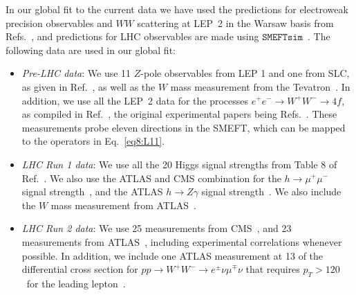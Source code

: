 \documentclass[../report.tex]{subfiles}
\begin{document}
In our global fit to the current data we have used the predictions for electroweak precision observables and $WW$ scattering at LEP~2 in the 
Warsaw basis from Refs.~\cite{Berthier:2016tkq, Brivio:2017vri}, and predictions for LHC observables are made using $\mathtt{SMEFTsim}$~\cite{Brivio:2017btx}.
The following data are used in our global fit:

\begin{itemize}
\item \textit{Pre-LHC data}:  
We use 11 $Z$-pole observables from LEP 1 and one from SLC, as given in Ref.~\cite{ALEPH:2005ab}, as well as the $W$ mass measurement from the 
Tevatron~\cite{Aaltonen:2013iut}.
In addition, we use all the LEP~2 data for the processes $e^+ e^- \to W^+ W^- \to 4f$,
as compiled in Ref.~\cite{Berthier:2016tkq}, the original experimental papers being Refs.~\cite{Heister:2004wr, Achard:2004zw, Abbiendi:2007rs, Schael:2013ita}. 
These measurements probe eleven directions in the SMEFT, which can be mapped to the operators in Eq.~\eqref{eq8:L11}.

\item \textit{LHC Run 1 data}: 
We use all the 20 Higgs signal strengths from Table 8 of Ref.~\cite{Khachatryan:2016vau}.
We also use the ATLAS and CMS combination for the $h \to \mu^+ \mu^-$ signal strength~\cite{Khachatryan:2016vau}, and the ATLAS $h \to Z \gamma$ signal strength~\cite{Aad:2015gba}. 
We also include the $W$ mass measurement from ATLAS~\cite{Aaboud:2017svj}.

\item \textit{LHC Run 2 data}: 
We use 25 measurements from CMS~\cite{Sirunyan:2017dgc, Sirunyan:2017elk, Sirunyan:2018mvw, Sirunyan:2018shy, CMS-PAS-HIG-16-042, Sirunyan:2018ouh, Sirunyan:2017exp, Sirunyan:2017khh}, and 23 measurements from ATLAS~\cite{Aaboud:2017ojs, Aaboud:2017xsd, Aaboud:2017rss, Aaboud:2017jvq, ATLAS-CONF-2018-004, ATLAS-CONF-2017-047, ATLAS-CONF-2016-112}, including experimental correlations whenever possible. 
In addition, we include one ATLAS measurement at 13 \UTeV of the differential cross section for $p p \to W^+ W^- \to e^{\pm} \nu \mu^{\mp} \nu$
that requires $p_T > 120$~\UGeV for the leading lepton~\cite{Aaboud:2017qkn}.
\end{itemize}
\end{document}

